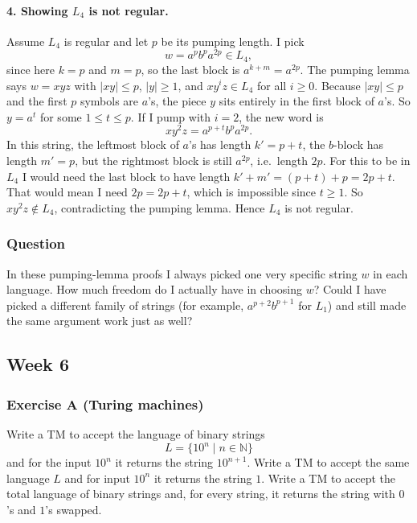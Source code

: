 \documentclass{article}
\theoremstyle{theorem}
\theoremstyle{definition}
\theoremstyle{remark}
\begin{document}
\paragraph{4. Showing $L_4$ is not regular.}
Assume $L_4$ is regular and let $p$ be its pumping length. I pick
\[
w = a^{p} b^{p} a^{2p} \in L_4,
\]
since here $k = p$ and $m = p$, so the last block is $a^{k+m} = a^{2p}$. The pumping lemma says $w = xyz$ with $|xy| \le p$, $|y| \ge 1$, and $xy^i z \in L_4$ for all $i \ge 0$. Because $|xy| \le p$ and the first $p$ symbols are $a$'s, the piece $y$ sits entirely in the first block of $a$'s. So $y = a^t$ for some $1 \le t \le p$.\newline
If I pump with $i = 2$, the new word is
\[
xy^2 z = a^{p+t} b^{p} a^{2p}.
\]
In this string, the leftmost block of $a$'s has length $k' = p+t$, the $b$-block has length $m' = p$, but the rightmost block is still $a^{2p}$, i.e.\ length $2p$. For this to be in $L_4$ I would need the last block to have length $k' + m' = (p+t) + p = 2p + t$. That would mean I need $2p = 2p + t$, which is impossible since $t \ge 1$. So $xy^2z \notin L_4$, contradicting the pumping lemma. Hence $L_4$ is not regular.

\subsubsection*{Question}
In these pumping-lemma proofs I always picked one very specific string $w$ in each language. How much freedom do I actually have in choosing $w$? Could I have picked a different family of strings (for example, $a^{p+2}b^{p+1}$ for $L_1$) and still made the same argument work just as well?

\subsection{Week 6}\label{sec:week6}

\subsubsection*{Exercise A (Turing machines)}
Write a TM to accept the language of binary strings
\[
L = \{ 1 0^n \mid n \in \mathbb{N} \}
\]
and for the input $10^n$ it returns the string $10^{n+1}$. Write a TM to accept the same language $L$ and for input $10^n$ it returns the string $1$. Write a TM to accept the total language of binary strings and, for every string, it returns the string with $0$'s and $1$'s swapped.
\end{document}

